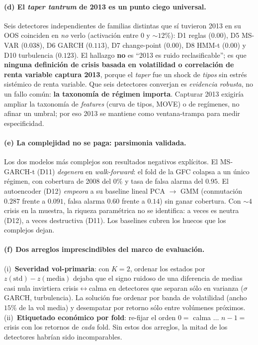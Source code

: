 \documentclass[11pt,a4paper]{article}
\begin{document}
\paragraph{(d) El \emph{taper tantrum} de 2013 es un punto ciego universal.} Seis
detectores independientes de familias distintas que s\'i tuvieron 2013 en su OOS coinciden
en \emph{no} verlo (activaci\'on entre $0$ y $\sim12\%$): D1 reglas ($0.00$), D5 MS-VAR
($0.038$), D6 GARCH ($0.113$), D7 change-point ($0.00$), D8 HMM-t ($0.00$) y D10 turbulencia
($0.123$). El hallazgo \textbf{no} es ``2013 es ruido reclasificable''; es que \textbf{ninguna
definici\'on de crisis basada en volatilidad o correlaci\'on de renta variable captura
2013}, porque el \emph{taper} fue un shock de \emph{tipos} sin estr\'es sist\'emico de
renta variable. Que seis detectores converjan es \emph{evidencia robusta}, no un fallo
com\'un: \textbf{la taxonom\'ia de r\'egimen importa}. Capturar 2013 exigir\'ia ampliar la
taxonom\'ia de \emph{features} (curva de tipos, MOVE) o de reg\'imenes, no afinar un umbral;
por eso 2013 se mantiene como ventana-trampa para medir especificidad.

\paragraph{(e) La complejidad no se paga: parsimonia validada.} Los dos modelos m\'as
complejos son resultados negativos expl\'icitos. El MS-GARCH-t (D11) \emph{degenera} en
\emph{walk-forward}: el fold de la GFC colapsa a un \'unico r\'egimen, con cobertura de
2008 del $0\%$ y tasa de falsa alarma del $0.95$. El autoencoder (D12) \emph{empeora} a su
baseline lineal PCA $\to$ GMM (conmutaci\'on $0.287$ frente a $0.091$, falsa alarma $0.60$
frente a $0.14$) sin ganar cobertura. Con $\sim4$ crisis en la muestra, la riqueza
param\'etrica no se identifica: a veces es neutra (D12), a veces destructiva (D11). Los
baselines cubren los huecos que los complejos dejan.

\paragraph{(f) Dos arreglos imprescindibles del marco de evaluaci\'on.} (i)~\textbf{Severidad
vol-primaria}: con $K{=}2$, ordenar los estados por $z(\text{std})-z(\text{media})$ dejaba
que el signo ruidoso de una diferencia de medias casi nula invirtiera crisis$\leftrightarrow$calma
en detectores que separan s\'olo en varianza ($\sigma$ GARCH, turbulencia). La soluci\'on
fue ordenar por banda de volatilidad (ancho $15\%$ de la vol media) y desempatar por retorno
s\'olo entre vol\'umenes pr\'oximos. (ii)~\textbf{Etiquetado econ\'omico por fold}: re-fijar
el orden $0=$ calma $\dots$ $n{-}1=$ crisis con los retornos de \emph{cada} fold. Sin estos
dos arreglos, la mitad de los detectores habr\'ian sido incomparables.
\end{document}
